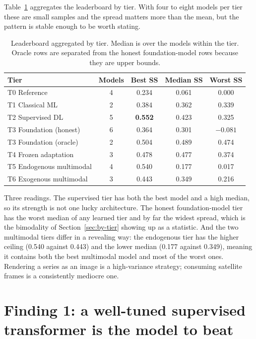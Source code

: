Table~\ref{tab:tier-summary} aggregates the leaderboard by tier. With four to eight models per
tier these are small samples and the spread matters more than the mean, but the pattern is
stable enough to be worth stating.

\begin{table}[h!]
\centering
\small
\begin{tabular}{l c c c c}
\hline
\textbf{Tier} & \textbf{Models} & \textbf{Best SS} & \textbf{Median SS} & \textbf{Worst SS} \\
\hline
T0 Reference & 4 & 0.234 & 0.061 & 0.000 \\
T1 Classical ML & 2 & 0.384 & 0.362 & 0.339 \\
T2 Supervised DL & 5 & \textbf{0.552} & 0.423 & 0.325 \\
T3 Foundation (honest) & 6 & 0.364 & 0.301 & $-0.081$ \\
T3 Foundation (oracle) & 2 & 0.504 & 0.489 & 0.474 \\
T4 Frozen adaptation & 3 & 0.478 & 0.477 & 0.374 \\
T5 Endogenous multimodal & 4 & 0.540 & 0.177 & 0.017 \\
T6 Exogenous multimodal & 3 & 0.443 & 0.349 & 0.216 \\
\hline
\end{tabular}
\caption{Leaderboard aggregated by tier. Median is over the models within the tier. Oracle
rows are separated from the honest foundation-model rows because they are upper bounds.}
\label{tab:tier-summary}
\end{table}

Three readings. The supervised tier has both the best model and a high median, so its strength
is not one lucky architecture. The honest foundation-model tier has the worst median of any
learned tier and by far the widest spread, which is the bimodality of
Section~\ref{sec:by-tier} showing up as a statistic. And the two multimodal tiers differ in a
revealing way: the endogenous tier has the higher ceiling (0.540 against 0.443) and the lower
median (0.177 against 0.349), meaning it contains both the best multimodal model and most of
the worst ones. Rendering a series as an image is a high-variance strategy; consuming
satellite frames is a consistently mediocre one.

\section{Finding 1: a well-tuned supervised transformer is the model to beat}
\label{sec:finding1}

